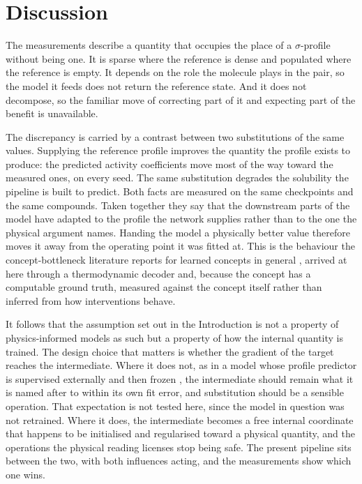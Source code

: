 \section{Discussion}
\label{sec:discussion}

The measurements describe a quantity that occupies the place of a $\sigma$-profile without being
one. It is sparse where the reference is dense and populated where the reference is empty. It
depends on the role the molecule plays in the pair, so the model it feeds does not return the
reference state. And it does not decompose, so the familiar move of correcting part of it and
expecting part of the benefit is unavailable.

The discrepancy is carried by a contrast between two substitutions of the same values. Supplying
the reference profile improves the quantity the profile exists to produce: the predicted activity
coefficients move most of the way toward the measured ones, on every seed. The same substitution
degrades the solubility the pipeline is built to predict. Both facts are measured on the same
checkpoints and the same compounds. Taken together they say that the downstream parts of the model
have adapted to the profile the network supplies rather than to the one the physical argument
names. Handing the model a physically better value therefore moves it away from the operating
point it was fitted at. This is the behaviour the concept-bottleneck literature reports for
learned concepts in general \cite{koh2020cbm,margeloiu2021}, arrived at here through a
thermodynamic decoder and, because the concept has a computable ground truth, measured against the
concept itself rather than inferred from how interventions behave.

It follows that the assumption set out in the Introduction is not a property of physics-informed
models as such but a property of how the internal quantity is trained. The design choice that
matters is whether the gradient of the target reaches the intermediate. Where it does not, as in a
model whose profile predictor is supervised externally and then frozen \cite{yang2025tennet}, the
intermediate should remain what it is named after to within its own fit error, and substitution
should be a sensible operation. That expectation is not tested here, since the model in question
was not retrained. Where it does, the intermediate becomes a free internal coordinate that happens
to be initialised and regularised toward a physical quantity, and the operations the physical
reading licenses stop being safe. The present pipeline sits between the two, with both influences
acting, and the measurements show which one wins.

